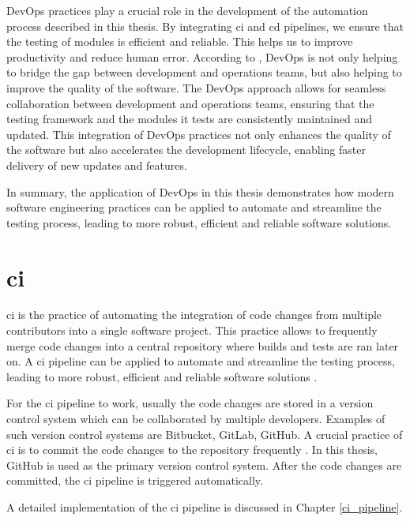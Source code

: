 DevOps practices play a crucial role in the development of the automation process described in this thesis. By integrating \acrfull{ci} and \acrfull{cd} pipelines, we ensure that the testing of 
modules is efficient and reliable. This helps us to improve productivity and reduce human error. According to \cite{8257807}, DevOps is not only helping to bridge
the gap between development and operations teams, but also helping to improve the quality of the software.
The DevOps approach allows for seamless collaboration between development and operations teams, 
ensuring that the testing framework and the modules it tests are consistently maintained and updated. This integration of DevOps practices not only enhances the quality of the software but also 
accelerates the development lifecycle, enabling faster delivery of new updates and features.\newline

In summary, the application of DevOps in this thesis demonstrates how modern software engineering practices can be applied to automate and streamline the testing process, leading to more robust,
efficient and reliable software solutions.

\section{\acrlong{ci}}
    \acrfull{ci} is the practice of automating the integration of code changes from multiple contributors into a single software project. This practice allows
    to frequently merge code changes into a central repository where builds and tests are ran later on. A \acrshort{ci} pipeline can be applied to automate 
    and streamline the testing process, leading to more robust, efficient and reliable software solutions \cite{8421965}.

    For the \acrshort{ci} pipeline to work, usually the code changes are stored in a version control system which can be collaborated by multiple developers.
    Examples of such version control systems are Bitbucket, GitLab, GitHub. A crucial practice of \acrshort{ci} is to commit the code changes to the repository 
    frequently \cite{6802994}. In this thesis, GitHub is used as the primary version control system. After the code changes are committed, the \acrshort{ci} 
    pipeline is triggered automatically. 

    A detailed implementation of the \acrshort{ci} pipeline is discussed in Chapter \ref{ci_pipeline}. 

